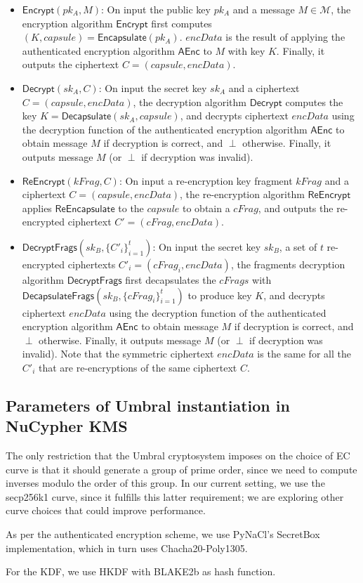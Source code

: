 \documentclass{amsart}
\begin{document}
\begin{itemize}
	
	\item $\mathsf{Encrypt}(pk_A, M)$: On input the public key $pk_A$ and a message $M\in\mathcal{M}$, the encryption algorithm $\mathsf{Encrypt}$ first computes $(K, capsule) = \mathsf{Encapsulate}(pk_A)$.
	$encData$ is the result of applying the authenticated encryption algorithm $\mathsf{AEnc}$ to $M$ with key $K$. 
	Finally, it outputs the ciphertext $C = (capsule, encData)$.
	
	\item $\mathsf{Decrypt}(sk_A, C)$: On input the secret key $sk_A$ and a ciphertext $C = (capsule, encData)$, the decryption algorithm $\mathsf{Decrypt}$ computes the key $K = \mathsf{Decapsulate}(sk_A, capsule)$, and decrypts ciphertext $encData$ using the decryption function of the authenticated encryption algorithm $\mathsf{AEnc}$ to obtain message $M$ if decryption is correct, and $\perp$ otherwise. Finally, it outputs message $M$ (or $\perp$ if decryption was invalid).
	
	\item $\mathsf{ReEncrypt}(kFrag, C)$: On input a re-encryption key fragment $kFrag$ and a ciphertext $C = (capsule, encData)$, the re-encryption algorithm $\mathsf{ReEncrypt}$ applies $\mathsf{ReEncapsulate}$ to the $capsule$ to obtain a $cFrag$, and outputs the re-encrypted ciphertext $C' = (cFrag, encData)$.
	
	\item $\mathsf{DecryptFrags}(sk_B, \{C'_i\}_{i=1}^t)$: On input the secret key $sk_B$, a set of $t$ re-encrypted ciphertexts $C'_i = (cFrag_i, encData)$, the fragments decryption algorithm $\mathsf{DecryptFrags}$ first decapsulates the $cFrags$ with $\mathsf{DecapsulateFrags}(sk_B, \{cFrag_i\}_{i=1}^t)$ to produce key $K$, and decrypts ciphertext $encData$ using the decryption function of the authenticated encryption algorithm $\mathsf{AEnc}$ to obtain message $M$ if decryption is correct, and $\perp$ otherwise. Finally, it outputs message $M$ (or $\perp$ if decryption was invalid).	Note that the symmetric ciphertext $encData$ is the same for all the $C'_i$ that are re-encryptions of the same ciphertext $C$. 
	
\end{itemize}
	


\subsection{Parameters of Umbral instantiation in NuCypher KMS}
The only restriction that the Umbral cryptosystem imposes on the choice of EC curve is that it should generate a group of prime order, since we need to compute inverses modulo the order of this group. In our current setting, we use the secp256k1 curve, since it fulfills this latter requirement; we are exploring other curve choices that could improve performance. 

As per the authenticated encryption scheme, we use PyNaCl's SecretBox implementation, which in turn uses Chacha20-Poly1305.

For the KDF, we use HKDF with BLAKE2b as hash function. 


\end{document}
